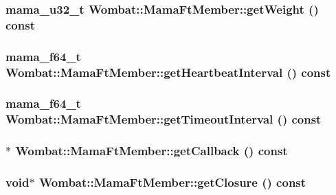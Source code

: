 \label{classWombat_1_1MamaFtMember_a2f82bbb437a4064fa2ba261453fc6d61}
\hypertarget{classWombat_1_1MamaFtMember_a1b80e55dd3137e78f1e4eeabd647163e}{
\subsubsection[{getWeight}]{\setlength{\rightskip}{0pt plus 5cm}mama\_\-u32\_\-t Wombat::MamaFtMember::getWeight () const}}
\label{classWombat_1_1MamaFtMember_a1b80e55dd3137e78f1e4eeabd647163e}
\hypertarget{classWombat_1_1MamaFtMember_a69457de68353a2f666d657fc0d1de19f}{
\subsubsection[{getHeartbeatInterval}]{\setlength{\rightskip}{0pt plus 5cm}mama\_\-f64\_\-t Wombat::MamaFtMember::getHeartbeatInterval () const}}
\label{classWombat_1_1MamaFtMember_a69457de68353a2f666d657fc0d1de19f}
\hypertarget{classWombat_1_1MamaFtMember_a1d4d5d3402fdca072abf8a586c6f2b5b}{
\subsubsection[{getTimeoutInterval}]{\setlength{\rightskip}{0pt plus 5cm}mama\_\-f64\_\-t Wombat::MamaFtMember::getTimeoutInterval () const}}
\label{classWombat_1_1MamaFtMember_a1d4d5d3402fdca072abf8a586c6f2b5b}
\hypertarget{classWombat_1_1MamaFtMember_a663ef7867faff8323d0f22cdf8f9bc98}{
\subsubsection[{getCallback}]{$\ast$ Wombat::MamaFtMember::getCallback () const}}
\label{classWombat_1_1MamaFtMember_a663ef7867faff8323d0f22cdf8f9bc98}
\hypertarget{classWombat_1_1MamaFtMember_ae85d406375efd4325671c4109df3f56d}{
\subsubsection[{getClosure}]{\setlength{\rightskip}{0pt plus 5cm}void$\ast$ Wombat::MamaFtMember::getClosure () const}}

